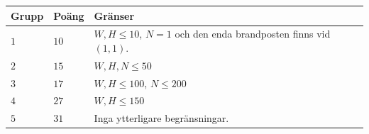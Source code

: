 \noindent
\begin{tabular}{| l | l | p{12cm} |}
  \hline
  \textbf{Grupp} & \textbf{Poäng} & \textbf{Gränser} \\ \hline
  $1$    & $10$       & $W,H \le 10$, $N=1$ och den enda brandposten finns vid $(1,1)$. \\ \hline
  $2$    & $15$       & $W,H,N \le 50$ \\ \hline
  $3$    & $17$       & $W,H \le 100$, $N\le 200$\\ \hline
  $4$    & $27$       & $W,H \le 150$ \\ \hline
  $5$    & $31$       & Inga ytterligare begränsningar. \\ \hline
\end{tabular}


